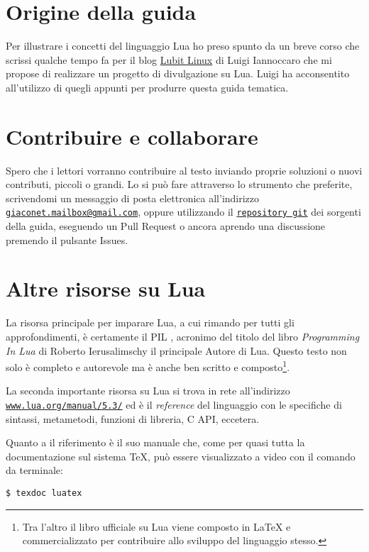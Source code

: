 \section{Origine della guida}

Per illustrare i concetti del linguaggio Lua ho preso spunto da un breve corso
che scrissi qualche tempo fa per il blog
\href{http://parliamodi-ubuntu.blogspot.it}{Lubit Linux} di Luigi Iannoccaro che
mi propose di realizzare un progetto di divulgazione su Lua. Luigi ha
acconsentito all'utilizzo di quegli appunti per produrre questa guida tematica.


\section{Contribuire e collaborare}

Spero che i lettori vorranno contribuire al testo inviando proprie soluzioni o
nuovi contributi, piccoli o grandi. Lo si può fare attraverso lo strumento che
preferite, scrivendomi un messaggio di posta elettronica all'indirizzo
\href{mailto:giaconet.mailbox@gmail.com}{\texttt{giaconet.mailbox@gmail.com}},
oppure utilizzando il
\href{https://github.com/GuITeX/guidalua}{\texttt{repository git}} dei sorgenti
della guida, eseguendo un Pull Request o ancora aprendo una discussione premendo
il pulsante Issues.


\section{Altre risorse su Lua}

La risorsa principale per imparare Lua, a cui rimando per tutti gli
approfondimenti, è certamente il PIL \cite{PIL}, acronimo del titolo del libro
\emph{Programming In Lua} di Roberto Ierusalimschy il principale Autore di Lua.
Questo testo non solo è completo e autorevole ma è anche ben scritto e
composto\footnote{Tra l'altro il libro ufficiale su Lua viene composto in
\LaTeX{} e commercializzato per contribuire allo sviluppo del linguaggio
stesso.}.

La seconda importante risorsa su Lua si trova in rete all'indirizzo
\href{https://www.lua.org/manual/5.3/}{\texttt{www.lua.org/manual/5.3/}} ed è il
\emph{reference} del linguaggio \cite{web:luaref} con le specifiche di sintassi,
metametodi, funzioni di libreria, C API, eccetera.

Quanto a \LuaTeX{} il riferimento è il suo manuale \cite{prg:luatex} che, come
per quasi tutta la documentazione sul sistema \TeX{}, può essere visualizzato a
video con il comando da terminale:
\begin{Verbatim}[numbers=none]
$ texdoc luatex
\end{Verbatim}


